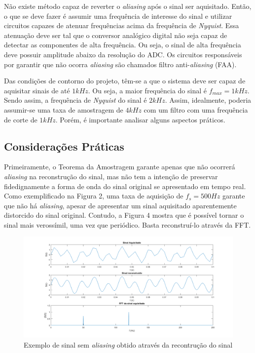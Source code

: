 \documentclass[11pt]{abntex2}
\begin{document}
			Não existe método capaz de reverter o \textit{aliasing} após o sinal ser
			aquisitado. Então, o que se deve fazer é assumir uma frequência de
			interesse do sinal e utilizar circuitos capazes de atenuar
			frequências acima da frequência de \textit{Nyquist}. Essa atenuação deve ser
			tal que o conversor analógico digital não seja capaz de detectar as
			componentes de alta frequência. Ou seja, o sinal de alta frequência
			deve possuir amplitude abaixo da resolução do ADC. Os circuitos
			responsáveis por garantir que não ocorra \textit{aliasing} são chamados
			filtro anti-\textit{aliasing} (FAA).

			Das condições de contorno do projeto, têm-se a que o sistema deve
			ser capaz de aquisitar sinais de até $1kHz$. Ou seja, a maior
			frequência do sinal é $f_{max} = 1kHz$. Sendo assim, a frequência de
			\textit{Nyquist} do sinal é $2kHz$. Assim, idealmente, poderia assumir-se uma
			taxa de amostragem de $4kHz$ com um filtro com uma frequência de corte
			de $1kHz$. Porém, é importante analisar alguns aspectos práticos.

			\subsection{Considerações Práticas}
				Primeiramente, o Teorema da Amostragem garante apenas que não
				ocorrerá \textit{aliasing} na reconstrução do sinal, mas não tem
				a intenção de preservar fidedignamente a forma de onda do sinal
				original se apresentado em tempo real. Como exemplificado na
				Figura 2, uma taxa de aquisição de $f_s=500Hz$ garante que não
				há \textit{aliasing}, apesar de apresentar um sinal aquisitado
				aparentemente distorcido do sinal original. Contudo, a Figura 4
				mostra que é possível tornar o sinal mais verossímil, uma vez
				que periódico. Basta reconstruí-lo através da FFT.

				\begin{figure}[!ht]
					\centering
					\includegraphics[width=\linewidth]{../Fotos/aliasingFs500Reconstruido.png}
					\caption{Exemplo de sinal sem \textit{aliasing} obtido através da recontrução do sinal}
				\end{figure}
\end{document}
